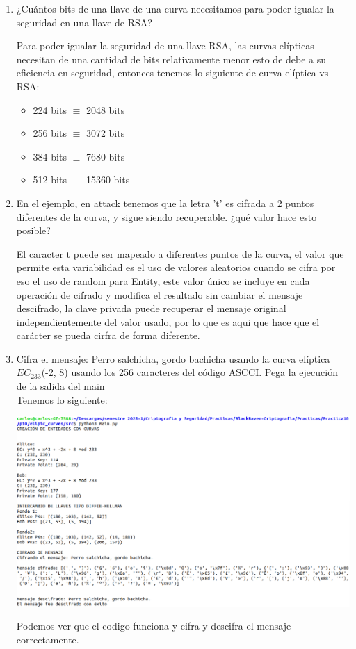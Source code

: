 \documentclass{article}
\begin{document}
\begin{enumerate}
    \item ¿Cuántos bits de una llave de una curva necesitamos para poder igualar la seguridad en una llave de RSA?

    Para poder igualar la seguridad de una llave RSA, las curvas elípticas necesitan de una cantidad de bits relativamente menor esto de debe a su eficiencia en seguridad, entonces tenemos lo siguiente de curva elíptica vs RSA:

    \begin{itemize}
        \item 224 bits $\equiv$ 2048 bits

        \item 256 bits $\equiv$ 3072 bits

        \item 384 bits $\equiv$ 7680 bits

        \item 512 bits $\equiv$ 15360 bits
    \end{itemize}

    \item En el ejemplo, en attack tenemos que la letra 't' es cifrada a 2 puntos diferentes de la curva, y sigue siendo recuperable. ¿qué valor hace esto posible?

    El caracter t puede ser mapeado a diferentes puntos de la curva, el valor que permite esta variabilidad es el uso de valores aleatorios cuando se cifra por eso el uso de random para Entity, este valor único se incluye en cada operación de cifrado y modifica el resultado sin cambiar el mensaje descifrado, la clave privada puede recuperar el mensaje original independientemente del valor usado, por lo que es aqui que hace que el carácter se pueda cirfra de forma diferente. 

    \item Cifra el mensaje: Perro salchicha, gordo bachicha usando la curva elíptica $EC_{233}$(-2, 8) usando los 256 caracteres del código ASCCI. Pega la ejecución de la salida del main\\

    Tenemos lo siguiente:

    \begin{center}
        \includegraphics[scale = .41]{IMAGE/E6.png}
    \end{center}

    Podemos ver que el codigo funciona y cifra y descifra el mensaje correctamente.

\end{enumerate}
\end{document}
